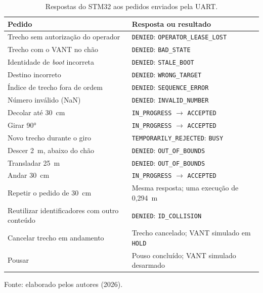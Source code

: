 \begin{table}[H]
    \centering
    \caption{Respostas do STM32 aos pedidos enviados pela UART.}
    \label{tab:com_recusas}
    \small
    \renewcommand{\arraystretch}{1.15}
    \begin{tabular}{p{6.4cm}p{6.9cm}}
        \hline
        \textbf{Pedido} & \textbf{Resposta ou resultado} \\
        \hline
        Trecho sem autorização do operador &
        \texttt{DENIED}: \texttt{OPERATOR\_LEASE\_LOST} \\
        Trecho com o VANT no chão &
        \texttt{DENIED}: \texttt{BAD\_STATE} \\
        Identidade de \textit{boot} incorreta &
        \texttt{DENIED}: \texttt{STALE\_BOOT} \\
        Destino incorreto &
        \texttt{DENIED}: \texttt{WRONG\_TARGET} \\
        Índice de trecho fora de ordem &
        \texttt{DENIED}: \texttt{SEQUENCE\_ERROR} \\
        Número inválido (NaN) &
        \texttt{DENIED}: \texttt{INVALID\_NUMBER} \\
        Decolar até 30~cm &
        \texttt{IN\_PROGRESS} $\rightarrow$ \texttt{ACCEPTED} \\
        Girar 90° &
        \texttt{IN\_PROGRESS} $\rightarrow$ \texttt{ACCEPTED} \\
        Novo trecho durante o giro &
        \texttt{TEMPORARILY\_REJECTED}: \texttt{BUSY} \\
        Descer 2~m, abaixo do chão &
        \texttt{DENIED}: \texttt{OUT\_OF\_BOUNDS} \\
        Transladar 25~m &
        \texttt{DENIED}: \texttt{OUT\_OF\_BOUNDS} \\
        Andar 30~cm &
        \texttt{IN\_PROGRESS} $\rightarrow$ \texttt{ACCEPTED} \\
        Repetir o pedido de 30~cm &
        Mesma resposta; uma execução de 0,294~m \\
        Reutilizar identificadores com outro conteúdo &
        \texttt{DENIED}: \texttt{ID\_COLLISION} \\
        Cancelar trecho em andamento &
        Trecho cancelado; VANT simulado em \texttt{HOLD} \\
        Pousar &
        Pouso concluído; VANT simulado desarmado \\
        \hline
    \end{tabular}
    \par\vspace{0.2cm}
    \footnotesize Fonte: elaborado pelos autores (2026).
\end{table}

